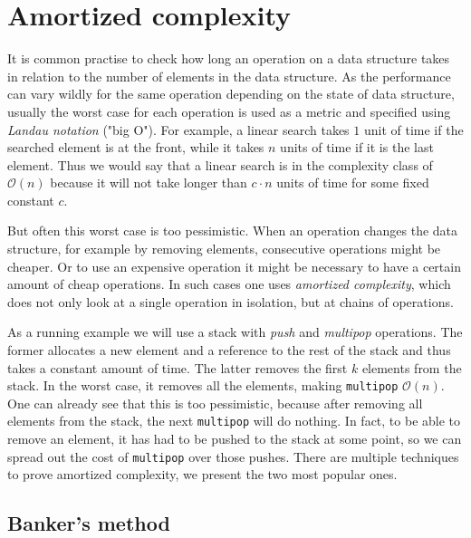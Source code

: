 \documentclass[sigplan,screen,review,anonymous]{acmart}
\renewcommand\O[1]{$\mathcal{O}(#1)$}
\begin{document}
\section{Amortized complexity}\label{sec:complexity}

It is common practise to check how long an operation on a data structure takes in relation to the number of elements in the data structure. As the performance can vary wildly for the same operation depending on the state of data structure, usually the worst case for each operation is used as a metric and specified using \textit{Landau notation} ("big O"). For example, a linear search takes $1$ unit of time if the searched element is at the front, while it takes $n$ units of time if it is the last element. Thus we would say that a linear search is in the complexity class of \O{n} because it will not take longer than $c \cdot n$ units of time for some fixed constant $c$.

But often this worst case is too pessimistic. When an operation changes the data structure, for example by removing elements, consecutive operations might be cheaper. Or to use an expensive operation it might be necessary to have a certain amount of cheap operations. In such cases one uses \textit{amortized complexity}, which does not only look at a single operation in isolation, but at chains of operations.

As a running example we will use a stack with \textit{push} and \textit{multipop} operations. The former allocates a new element and a reference to the rest of the stack and thus takes a constant amount of time. The latter removes the first $k$ elements from the stack. In the worst case, it removes all the elements, making \texttt{multipop} \O{n}. One can already see that this is too pessimistic, because after removing all elements from the stack, the next \texttt{multipop} will do nothing. In fact, to be able to remove an element, it has had to be pushed to the stack at some point, so we can spread out the cost of \texttt{multipop} over those pushes. There are multiple techniques to prove amortized complexity, we present the two most popular ones.

\subsection{Banker's method}\label{sec:banker}
\end{document}

